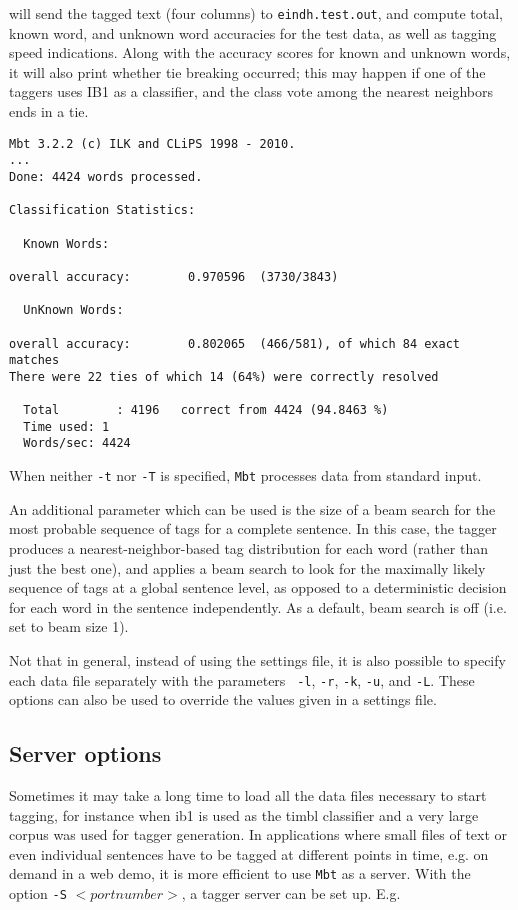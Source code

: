\documentclass{report}
\begin{document}
will send the tagged text (four columns) to {\tt eindh.test.out},
and compute total, known word, and unknown word accuracies for the
test data, as well as tagging speed indications. Along with the
accuracy scores for known and unknown words, it will also print
whether tie breaking occurred; this may happen if one of the taggers
uses IB1 as a classifier, and the class vote among the nearest
neighbors ends in a tie.

{\small
\begin{verbatim}
Mbt 3.2.2 (c) ILK and CLiPS 1998 - 2010.
...
Done: 4424 words processed.

Classification Statistics:

  Known Words:

overall accuracy:        0.970596  (3730/3843)

  UnKnown Words:

overall accuracy:        0.802065  (466/581), of which 84 exact matches 
There were 22 ties of which 14 (64%) were correctly resolved

  Total        : 4196	correct from 4424 (94.8463 %)
  Time used: 1
  Words/sec: 4424
\end{verbatim}
}

When neither {\tt -t} nor {\tt -T} is specified, {\tt Mbt} processes data from
standard input.

An additional parameter which can be used is the size of a beam search
for the most probable sequence of tags for a complete sentence. In
this case, the tagger produces a nearest-neighbor-based tag
distribution for each word (rather than just the best one), and
applies a beam search to look for the maximally likely sequence of tags
at a global sentence level, as opposed to a deterministic decision for
each word in the sentence independently. As a default, beam search is
off (i.e. set to beam size 1).

Not that in general, instead of using the settings file, it is also
possible to specify each data file separately with the parameters {\tt
  -l}, {\tt -r}, {\tt -k}, {\tt -u}, and {\tt -L}. These options can
also be used to override the values given in a settings file.


\subsection{Server options}

Sometimes it may take a long time to load all the data files necessary
to start tagging, for instance when {\sc ib1} is used as the {\sc
timbl} classifier and a very large corpus was used for tagger
generation. In applications where small files of text or even
individual sentences have to be tagged at different points in time,
e.g. on demand in a web demo, it is more efficient to use {\tt Mbt} as
a server. With the option {\tt -S} $<portnumber>$, a tagger server can be
set up. E.g.
\end{document}
